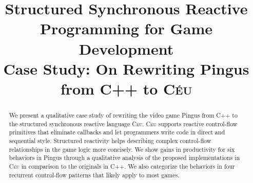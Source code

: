 \documentclass[10pt, conference, compsocconf]{IEEEtran}
\newcommand{\CEU}{\textsc{C\'{e}u}\xspace}
\begin{document}


\title{Structured Synchronous Reactive Programming for Game Development
        \\ \Large{Case Study: On Rewriting Pingus from C++ to \CEU}}

\maketitle

\begin{abstract}
We present a qualitative case study of rewriting the video game Pingus from C++
to the structured synchronous reactive language \CEU.
%
\CEU supports reactive control-flow primitives that eliminate callbacks and let
programmers write code in direct and sequential style.
Structured reactivity helps describing complex control-flow relationships in
the game logic more concisely.
%
We show gains in productivity for six behaviors in Pingus through a qualitative
analysis of the proposed implementations in \CEU in comparison to the originals
in C++.
%
We also categorize the behaviors in four recurrent control-flow patterns that
likely apply to most games.
\end{abstract}
\end{document}
